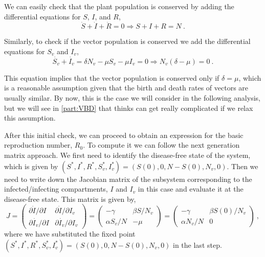 We can easily check that the plant population is conserved by adding the
differential equations for $S$, $I$, and $R$,
\begin{equation}
  \dot{S}+\dot{I}+\dot{R}=0\Longrightarrow S+I+R=N \ .
\end{equation}

Similarly, to check if the vector population is conserved we add the
differential equations for $S_v$ and $I_v$,
\begin{equation}
  \dot{S_v}+\dot{I_v}=\delta N_v -\mu S_v -\mu I_v=0\Longrightarrow
  N_v(\delta-\mu)=0 \ .
\end{equation}

This equation implies that the vector population is conserved only if
$\delta=\mu$, which is a reasonable assumption given that the birth and death
rates of vectors are usually similar. By now, this is the case we will
consider in the following analysis, but we will see in \cref{part:VBD}
that thinks can get really complicated if we relax this assumption.

After this initial check, we can proceed to obtain an expression for the basic
reproduction number, $R_0$. To compute it we can follow the next generation
matrix approach. We first need to identify the disease-free state of the
system, which is given by $(S^*,I^*,R^*,S_v^*,I_v^*)=(S(0),0,N-S(0),N_v,0)$.
Then we need to write down the Jacobian matrix of the subsystem corresponding
to the infected/infecting compartments, $I$ and $I_v$ in this case and evaluate
it at the disease-free state. This matrix is given by,
\begin{equation}
  J=\begin{pmatrix}
    \partial \dot{I}/\partial I   & \partial \dot{I}/\partial I_v   \\
    \partial \dot{I_v}/\partial I & \partial \dot{I_v}/\partial I_v
  \end{pmatrix}=
  \begin{pmatrix}
    -\gamma      & \beta S/N_v \\
    \alpha S_v/N & -\mu
  \end{pmatrix}=
  \begin{pmatrix}
    -\gamma      & \beta S(0)/N_v \\
    \alpha N_v/N & 0
  \end{pmatrix} \ ,
\end{equation}
where we have substituted the fixed point
$(S^*,I^*,R^*,S_v^*,I_v^*)=(S(0),0,N-S(0),N_v,0)$ in the last step.

